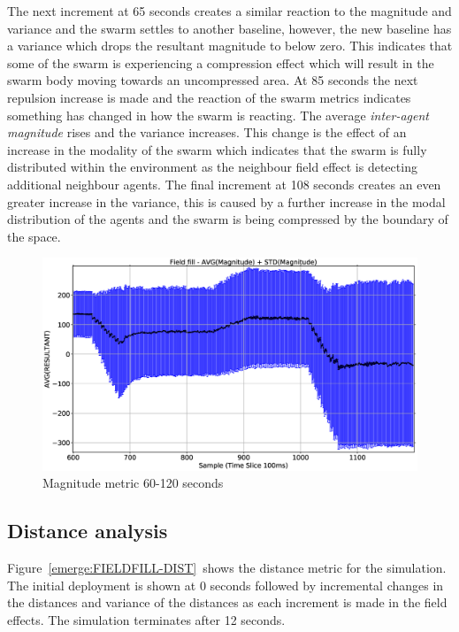 The next increment at 65 seconds creates a similar reaction to the magnitude and variance and the swarm settles to another baseline, however, the new baseline has a variance which drops the resultant magnitude to below zero. This indicates that some of the swarm is experiencing a compression effect which will result in the swarm body moving towards an uncompressed area. At 85 seconds the next repulsion increase is made and the reaction of the swarm metrics indicates something has changed in how the swarm is reacting. The average \textit{inter-agent magnitude} rises and the variance increases. This change is the effect of an increase in the modality of the swarm which indicates that the swarm is fully distributed within the environment as the neighbour field effect is detecting additional neighbour agents. The final increment at 108 seconds creates an even greater increase in the variance, this is caused by a further increase in the modal distribution of the agents and the swarm is being compressed by the boundary of the space.

\begin{figure}[H]
\begin{center}
\includegraphics[width=12cm]{CHAPTER-8/figures/FIELDFILL-MAG-2}
\end{center}
\caption{Magnitude metric 60-120 seconds\label{emerge:FIELDFILL-MAG-2}}
\end{figure}

\subsection{Distance analysis}
Figure~\ref{emerge:FIELDFILL-DIST}~shows the distance metric for the simulation. The initial deployment is shown at 0 seconds followed by incremental changes in the distances and variance of the distances as each increment is made in the field effects. The simulation terminates after 12 seconds.

